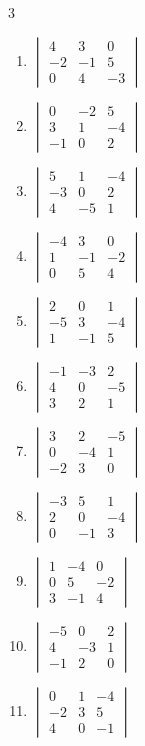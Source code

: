 \begin{multicols}{3}
\begin{enumerate}[label=\arabic*.,  leftmargin=*]
\item $\begin{vmatrix} 4 & 3 & 0 \\ -2 & -1 & 5 \\ 0 & 4 & -3 \end{vmatrix}$
\item $\begin{vmatrix} 0 & -2 & 5 \\ 3 & 1 & -4 \\ -1 & 0 & 2 \end{vmatrix}$
\item $\begin{vmatrix} 5 & 1 & -4 \\ -3 & 0 & 2 \\ 4 & -5 & 1 \end{vmatrix}$
\item $\begin{vmatrix} -4 & 3 & 0 \\ 1 & -1 & -2 \\ 0 & 5 & 4 \end{vmatrix}$
\item $\begin{vmatrix} 2 & 0 & 1 \\ -5 & 3 & -4 \\ 1 & -1 & 5 \end{vmatrix}$
\item $\begin{vmatrix} -1 & -3 & 2 \\ 4 & 0 & -5 \\ 3 & 2 & 1 \end{vmatrix}$
\item $\begin{vmatrix} 3 & 2 & -5 \\ 0 & -4 & 1 \\ -2 & 3 & 0 \end{vmatrix}$
\item $\begin{vmatrix} -3 & 5 & 1 \\ 2 & 0 & -4 \\ 0 & -1 & 3 \end{vmatrix}$
\item $\begin{vmatrix} 1 & -4 & 0 \\ 0 & 5 & -2 \\ 3 & -1 & 4 \end{vmatrix}$
\item $\begin{vmatrix} -5 & 0 & 2 \\ 4 & -3 & 1 \\ -1 & 2 & 0 \end{vmatrix}$
\item $\begin{vmatrix} 0 & 1 & -4 \\ -2 & 3 & 5 \\ 4 & 0 & -1 \end{vmatrix}$
\end{enumerate}
\end{multicols}


